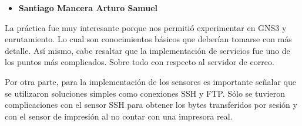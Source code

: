 \begin{itemize}
\item \textbf{Santiago Mancera Arturo Samuel}
\end{itemize}
La práctica fue muy interesante porque nos permitió experimentar en GNS3 y enrutamiento. Lo cual son conocimientos básicos que deberían tomarse con más detalle. Así mismo, cabe resaltar que la implementación de servicios fue uno de los puntos más complicados. Sobre todo con respecto al servidor de correo. 

Por otra parte, para la implementación de los sensores es importante señalar que se utilizaron soluciones simples como conexiones SSH y FTP. Sólo se tuvieron complicaciones con el sensor SSH para obtener los bytes transferidos por sesión y con el sensor de impresión al no contar con una impresora real.